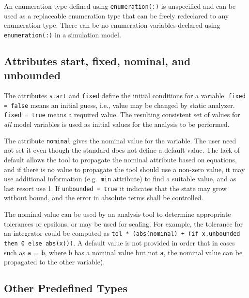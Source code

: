 An enumeration type defined using \lstinline!enumeration(:)! is unspecified and can be used as a replaceable enumeration type that can be freely redeclared to any enumeration type.
There can be no enumeration variables declared using \lstinline!enumeration(:)! in a simulation model.


\subsection{Attributes start, fixed, nominal, and unbounded}\label{attributes-start-fixed-nominal-and-unbounded}

The attributes \lstinline!start! and \lstinline!fixed! define the initial conditions for a variable.  \lstinline!fixed = false! means an initial guess, i.e., value may be changed by static analyzer.  \lstinline!fixed = true! means a required value.  The resulting consistent set of values for \emph{all} model variables is used as initial values for the analysis to be performed.

The attribute \lstinline!nominal! gives the nominal value for the variable.  The user need not set it even though the standard does not define a default value.  The lack of default allows the tool to propagate the nominal attribute based on equations, and if there is no value to propagate the tool should use a non-zero value, it may use additional information (e.g.\ \lstinline!min! attribute) to find a suitable value, and as last resort use 1.  If \lstinline!unbounded = true! it indicates that the state may grow without bound, and the error in absolute terms shall be controlled.

\begin{nonnormative}
The nominal value can be used by an analysis tool to determine appropriate tolerances or epsilons, or may be used for scaling.  For example, the tolerance for an integrator could be computed as \lstinline!tol * (abs(nominal) + (if x.unbounded then 0 else abs(x)))!.  A default value is not provided in order that in cases such as \lstinline!a = b!, where \lstinline!b! has a nominal value but not \lstinline!a!, the nominal value can be propagated to the other variable).
\end{nonnormative}


\subsection{Other Predefined Types}\label{other-predefined-types}

